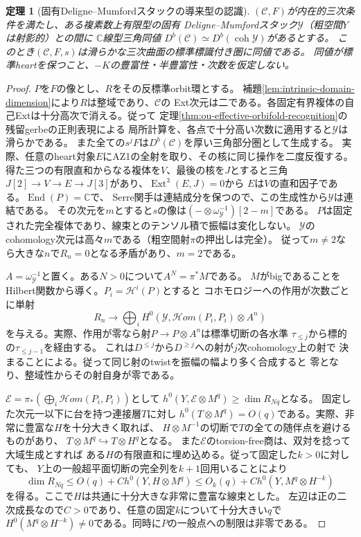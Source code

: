 \documentclass[11pt,a4paper]{ltjsarticle}
\newtheorem{theorem}{定理}[section]
\theoremstyle{definition}
\newcommand{\coh}{\operatorname{coh}}
\begin{document}
\begin{theorem}[固有Deligne--Mumfordスタックの導来型の認識]
\label{thm:ou-derived-stack-recognition}
$(\mathcal C,F)$が内在的三次条件を満たし、ある複素数上有限型の固有
Deligne--Mumfordスタック$\mathcal Y$（粗空間$Y$は射影的）との間に
$\mathbb C$線型三角同値
$D^b(\mathcal C)\simeq D^b(\coh\mathcal Y)$があるとする。
このとき$(\mathcal C,F,s)$は滑らかな三次曲面の標準標識付き圏に同値である。
同値が標準heartを保つこと、$-K$の豊富性・半豊富性・次数を仮定しない。
\end{theorem}
\begin{proof}
$P$を$F$の像とし、$R$をその反標準orbit環とする。
補題\ref{lem:intrinsic-domain-dimension}により$R$は整域であり、$\mathcal C$の
Ext次元は二である。各固定有界複体の自己Extは十分高次で消える。従って
定理\ref{thm:ou-effective-orbifold-recognition}の残留gerbeの正則表現による
局所計算を、各点で十分高い次数に適用すると$\mathcal Y$は滑らかである。
また全ての$s^jF$は$D^b(\mathcal C)$を厚い三角部分圏として生成する。
実際、任意のheart対象$E$にAZ1の全射を取り、その核に同じ操作を二度反復する。
得た三つの有限直和からなる複体を$V$、最後の核を$J$とすると三角
$J[2]\to V\to E\to J[3]$があり、$\operatorname{Ext}^3(E,J)=0$から
$E$は$V$の直和因子である。$\operatorname{End}(P)=\mathbb C$で、
Serre関手は連結成分を保つので、この生成性から$\mathcal Y$は連結である。
その次元を$m$とすると$s$の像は$(-\otimes\omega_{\mathcal Y}^{-1})[2-m]$である。
$P$は固定された完全複体であり、線束とのテンソル積で振幅は変化しない。
$\mathcal Y$のcohomology次元は高々$m$である（粗空間射$\pi$の押出しは完全）。
従って$m\ne2$なら大きな$n$で$R_n=0$となる矛盾があり、$m=2$である。

$A=\omega_{\mathcal Y}^{-1}$と置く。ある$N>0$について$A^N=\pi^*M$である。
$M$がbigであることをHilbert関数から導く。$P_i=\mathcal H^i(P)$とすると
コホモロジーへの作用が次数ごとに単射
\[
 R_n\longrightarrow\bigoplus_i H^0(\mathcal Y,
              \mathcal H om(P_i,P_i)\otimes A^n)
\]
を与える。実際、作用が零なら射$P\to P\otimes A^n$は標準切断の各水準
$\tau_{\le j}$から標的の$\tau_{\le j-1}$を経由する。
これは$D^{\le j}$から$D^{\ge j}$への射が$j$次cohomology上の射で
決まることによる。従って同じ射のtwistを振幅の幅より多く合成すると
零となり、整域性からその射自身が零である。

$\mathscr E=\pi_*(\bigoplus_i\mathcal H om(P_i,P_i))$として
$h^0(Y,\mathscr E\otimes M^q)\ge\dim R_{Nq}$となる。
固定した次元一以下に台を持つ連接層$T$に対し
$h^0(T\otimes M^q)=O(q)$である。実際、非常に豊富な$H$を十分大きく取れば、
$H\otimes M^{-1}$の切断で$T$の全ての随伴点を避けるものがあり、
$T\otimes M^q\hookrightarrow T\otimes H^q$となる。
また$\mathscr E$のtorsion-free商は、双対を捻って大域生成とすれば
ある$H$の有限直和に埋め込める。従って固定した$k>0$に対しても、
$Y$上の一般超平面切断の完全列を$k+1$回用いることにより
\[
 \dim R_{Nq}\le O(q)+C h^0(Y,H\otimes M^q)
             \le O_k(q)+C h^0(Y,M^q\otimes H^{-k})
\]
を得る。ここで$H$は共通に十分大きな非常に豊富な線束とした。
左辺は正の二次成長なので$C>0$であり、任意の固定$k$について十分大きい$q$で
$H^0(M^q\otimes H^{-k})\ne0$である。同時に$P$の一般点への制限は非零である。


\end{proof}
\end{document}
